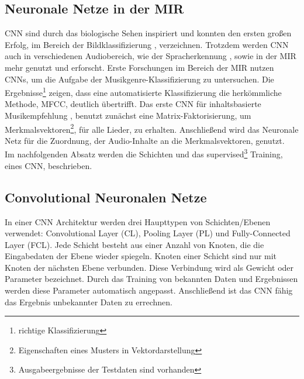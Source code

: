 \documentclass[twosided,a4,10pt]{article}
\begin{document}
\begin{multicols}{2}
		\section{Neuronale Netze in der MIR}
		CNN sind durch das biologische Sehen inspiriert und konnten den ersten großen Erfolg, im Bereich der Bildklassifizierung \cite{alex}, verzeichnen. Trotzdem werden CNN auch in verschiedenen Audiobereich, wie der Spracherkennung \cite{graves}, sowie in der MIR mehr genutzt und erforscht.\newline
		Erste Forschungen im Bereich der MIR nutzen CNNs, um die Aufgabe der Musikgenre-Klassifizierung \cite{lee} zu untersuchen. Die Ergebnisse\footnote[9]{richtige Klassifizierung} zeigen, dass eine automatisierte Klassifizierung die herkömmliche Methode, MFCC, deutlich übertrifft. Das erste CNN für inhaltsbasierte Musikempfehlung \cite{oord}, benutzt zunächst eine Matrix-Faktorisierung, um Merkmalsvektoren\footnote[10]{Eigenschaften eines Musters in Vektordarstellung}, für alle Lieder, zu erhalten. Anschließend wird das Neuronale Netz für die Zuordnung, der Audio-Inhalte an die Merkmalsvektoren, genutzt. \cite{wang}\newline\\
		Im nachfolgenden Absatz werden die Schichten und das supervised\footnote[10]{Ausgabeergebnisse der Testdaten sind vorhanden} Training, eines CNN, beschrieben.
		\subsection{Convolutional Neuronalen Netze}
		In einer CNN Architektur werden drei Haupttypen von Schichten/Ebenen verwendet: Convolutional Layer (CL), Pooling Layer (PL) und Fully-Connected Layer (FCL). Jede Schicht besteht aus einer Anzahl von Knoten, die die Eingabedaten der Ebene wieder spiegeln. Knoten einer Schicht sind nur mit Knoten der nächsten Ebene verbunden. Diese Verbindung wird als Gewicht oder Parameter bezeichnet. Durch das Training von bekannten Daten und Ergebnissen werden diese Parameter automatisch angepasst. Anschließend ist das CNN fähig das Ergebnis unbekannter Daten zu errechnen.

\end{multicols}
\end{document}
